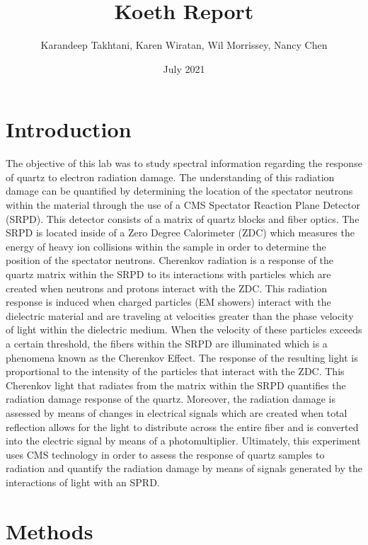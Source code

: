 \documentclass{article}
\title{Koeth Report}
\author{Karandeep Takhtani, Karen Wiratan, Wil Morrissey, Nancy Chen}
\date{July 2021}
\begin{document}
\maketitle

\section{Introduction}

The objective of this lab was to study spectral information regarding the response of quartz to electron radiation damage. The understanding of this radiation damage can be quantified by determining the location of the spectator neutrons within the material through the use of a CMS Spectator Reaction Plane Detector (SRPD). This detector consists of a matrix of quartz blocks and fiber optics. The SRPD is located inside of a Zero Degree Calorimeter (ZDC) which measures the energy of heavy ion collisions within the sample in order to determine the position of the spectator neutrons.
Cherenkov radiation is a response of the quartz matrix within the SRPD to its interactions with particles which are created when neutrons and protons interact with the ZDC. This radiation response is induced when charged particles (EM showers) interact with the dielectric material and are traveling at velocities greater than the phase velocity of light within the dielectric medium. When the velocity of these particles exceeds a certain threshold, the fibers within the SRPD are illuminated which is a phenomena known as the Cherenkov Effect. The response of the resulting light is proportional to the intensity of the particles that interact with the ZDC. 
This Cherenkov light that radiates from the matrix within the SRPD quantifies the radiation damage response of the quartz. Moreover, the radiation damage is assessed by means of changes in electrical signals which are created when total reflection allows for the light to distribute across the entire fiber and is converted into the electric signal by means of a photomultiplier. Ultimately, this experiment uses CMS technology in order to assess the response of quartz samples to radiation and quantify the radiation damage by means of signals generated by the interactions of light with an SPRD. 

\section{Methods}
\end{document}
